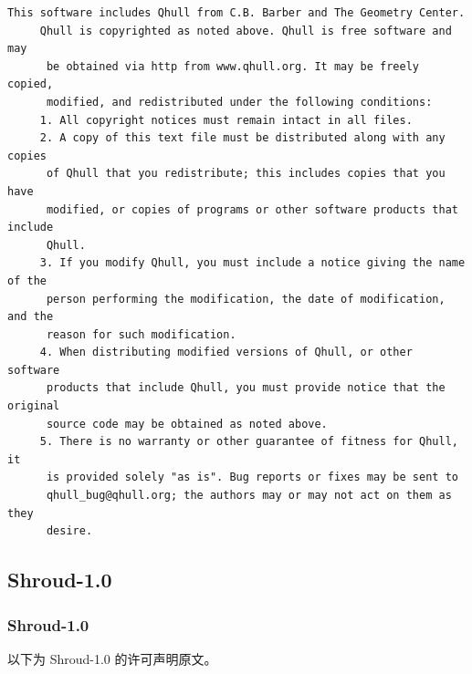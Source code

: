 \begin{lstlisting}[basicstyle=\ttfamily\footnotesize,breaklines=true]
     This software includes Qhull from C.B. Barber and The Geometry Center.
     Qhull is copyrighted as noted above. Qhull is free software and may
      be obtained via http from www.qhull.org. It may be freely copied,
      modified, and redistributed under the following conditions:
     1. All copyright notices must remain intact in all files.
     2. A copy of this text file must be distributed along with any copies
      of Qhull that you redistribute; this includes copies that you have
      modified, or copies of programs or other software products that include
      Qhull.
     3. If you modify Qhull, you must include a notice giving the name of the
      person performing the modification, the date of modification, and the
      reason for such modification.
     4. When distributing modified versions of Qhull, or other software
      products that include Qhull, you must provide notice that the original
      source code may be obtained as noted above.
     5. There is no warranty or other guarantee of fitness for Qhull, it
      is provided solely "as is". Bug reports or fixes may be sent to
      qhull_bug@qhull.org; the authors may or may not act on them as they
      desire.
\end{lstlisting}

\subsection{Shroud-1.0}
\subsubsection*{Shroud-1.0}

以下为 Shroud-1.0 的许可声明原文。

